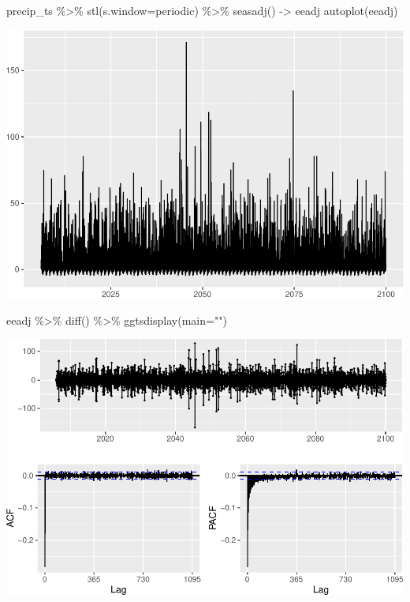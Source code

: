 \documentclass[
  paper=a4,
  ,captions=tableheading
]{scrartcl}
\newenvironment{Shaded}{\begin{snugshade}}{\end{snugshade}}
\newcommand{\AttributeTok}[1]{\textcolor[rgb]{0.77,0.63,0.00}{#1}}
\newcommand{\FunctionTok}[1]{\textcolor[rgb]{0.00,0.00,0.00}{#1}}
\newcommand{\NormalTok}[1]{#1}
\newcommand{\OtherTok}[1]{\textcolor[rgb]{0.56,0.35,0.01}{#1}}
\newcommand{\SpecialCharTok}[1]{\textcolor[rgb]{0.00,0.00,0.00}{#1}}
\newcommand{\StringTok}[1]{\textcolor[rgb]{0.31,0.60,0.02}{#1}}
\begin{document}
\begin{Shaded}
\begin{Highlighting}[]
\NormalTok{precip\_ts }\SpecialCharTok{\%\textgreater{}\%} \FunctionTok{stl}\NormalTok{(}\AttributeTok{s.window=}\StringTok{\textquotesingle{}periodic\textquotesingle{}}\NormalTok{) }\SpecialCharTok{\%\textgreater{}\%} \FunctionTok{seasadj}\NormalTok{() }\OtherTok{{-}\textgreater{}}\NormalTok{ eeadj}
\FunctionTok{autoplot}\NormalTok{(eeadj)}
\end{Highlighting}
\end{Shaded}

\includegraphics{Haskell_files/figure-latex/unnamed-chunk-87-1.pdf}

\begin{Shaded}
\begin{Highlighting}[]
\NormalTok{eeadj }\SpecialCharTok{\%\textgreater{}\%} \FunctionTok{diff}\NormalTok{() }\SpecialCharTok{\%\textgreater{}\%} \FunctionTok{ggtsdisplay}\NormalTok{(}\AttributeTok{main=}\StringTok{""}\NormalTok{)}
\end{Highlighting}
\end{Shaded}

\includegraphics{Haskell_files/figure-latex/unnamed-chunk-88-1.pdf}
\end{document}
